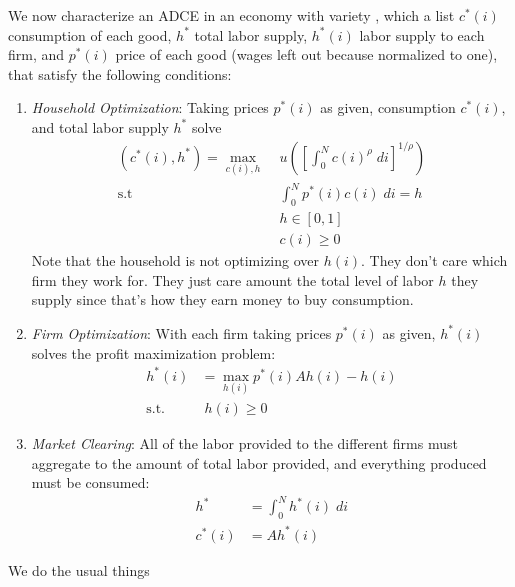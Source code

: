 \documentclass[12pt]{article}
\theoremstyle{plain}
\theoremstyle{definition}
\theoremstyle{remark}
\newcommand{\intzN}{\int_0^N}
\begin{document}
We now characterize an ADCE in an economy with variety , which a list
$c^*(i)$ consumption of each good, $h^*$ total labor supply, $h^*(i)$
labor supply to each firm, and $p^*(i)$ price of each good (wages left
out because normalized to one), that satisfy the following conditions:
\begin{enumerate}
  \item \emph{Household Optimization}: Taking prices $p^*(i)$ as given,
    consumption $c^*(i)$, and total labor supply $h^*$ solve
    \begin{align*}
      (c^*(i), h^*)
      = \max_{c(i), h}
        & \; u\left(
          \left[ \int_0^N c(i)^\rho \; di \right]^{1/\rho}
        \right)\\
      \text{s.t} & \;
        \intzN p^*(i) c(i) \; di= h \\
      &\; h\in[0,1] \\
      &\; c(i) \geq 0
    \end{align*}
    Note that the household is not optimizing over $h(i)$. They don't
    care which firm they work for. They just care amount the total level
    of labor $h$ they supply since that's how they earn money to buy
    consumption.

  \item \emph{Firm Optimization}: With each firm taking prices $p^*(i)$
    as given, $h^*(i)$ solves the profit maximization problem:
    \begin{align*}
      h^*(i)
      &=
      \max_{h(i)}
      p^*(i) Ah(i) - h(i) \\
      \text{s.t.} \;
      & \; h(i) \geq 0
    \end{align*}

  \item \emph{Market Clearing}: All of the labor provided to the
    different firms must aggregate to the amount of total labor
    provided, and everything produced must be consumed:
    \begin{align*}
       h^* &= \intzN h^*(i) \; di \\
       c^*(i) &= Ah^*(i)
    \end{align*}
\end{enumerate}
We do the usual things
\end{document}
